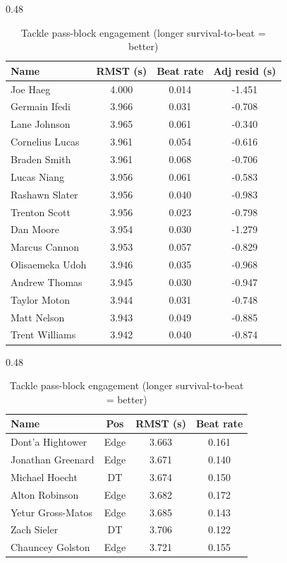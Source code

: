 \begin{table}[h!]
\centering
\begin{subtable}{0.48\textwidth}
\centering
\scriptsize
\begin{tabular}{lccc}
\toprule
Name & RMST (s) & Beat rate & Adj resid (s) \\
\midrule
Joe Haeg & 4.000 & 0.014 & -1.451 \\
Germain Ifedi & 3.966 & 0.031 & -0.708 \\
Lane Johnson & 3.965 & 0.061 & -0.340 \\
Cornelius Lucas & 3.961 & 0.054 & -0.616 \\
Braden Smith & 3.961 & 0.068 & -0.706 \\
Lucas Niang & 3.956 & 0.061 & -0.583 \\
Rashawn Slater & 3.956 & 0.040 & -0.983 \\
Trenton Scott & 3.956 & 0.023 & -0.798 \\
Dan Moore & 3.954 & 0.030 & -1.279 \\
Marcus Cannon & 3.953 & 0.057 & -0.829 \\
Olisaemeka Udoh & 3.946 & 0.035 & -0.968 \\
Andrew Thomas & 3.945 & 0.030 & -0.947 \\
Taylor Moton & 3.944 & 0.031 & -0.748 \\
Matt Nelson & 3.943 & 0.049 & -0.885 \\
Trent Williams & 3.942 & 0.040 & -0.874 \\
\bottomrule
\end{tabular}
\caption{Tackle pass-block engagement (longer survival-to-beat = better)}
\label{tab:block_engagement}
\end{subtable}
\hfill
\begin{subtable}{0.48\textwidth}
\centering
\scriptsize
\begin{tabular}{lccc}
\toprule
Name & Pos & RMST (s) & Beat rate \\
\midrule
Dont'a Hightower & Edge & 3.663 & 0.161 \\
Jonathan Greenard & Edge & 3.671 & 0.140 \\
Michael Hoecht & DT & 3.674 & 0.150 \\
Alton Robinson & Edge & 3.682 & 0.172 \\
Yetur Gross-Matos & Edge & 3.685 & 0.143 \\
Zach Sieler & DT & 3.706 & 0.122 \\
Chauncey Golston & Edge & 3.721 & 0.155 \\

\end{tabular}
\end{subtable}
\end{table}
